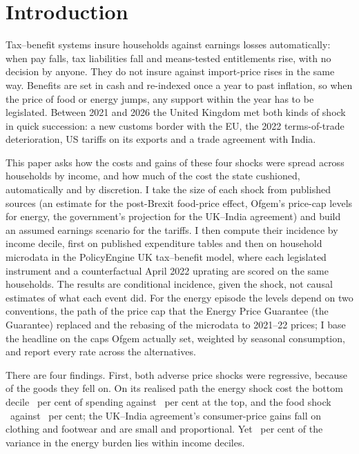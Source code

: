 \section{Introduction}\label{sec:intro}

Tax--benefit systems insure households against earnings losses
automatically: when pay falls, tax liabilities fall and means-tested
entitlements rise, with no decision by anyone. They do not insure
against import-price rises in the same way. Benefits are set in cash
and re-indexed once a year to past inflation, so when the price of
food or energy jumps, any support within the year has to be
legislated. Between 2021 and 2026 the United Kingdom met both kinds of
shock in quick succession: a new customs border with the EU, the 2022
terms-of-trade deterioration, US tariffs on its exports and a trade
agreement with India.

This paper asks how the costs and gains of these four shocks were
spread across households by income, and how much of the cost the state
cushioned, automatically and by discretion. I take the size
of each shock from published sources (an estimate for the post-Brexit
food-price effect, Ofgem's price-cap levels for energy, the
government's projection for the UK--India agreement) and build an
assumed earnings scenario for the tariffs. I then compute their
incidence by income decile, first on published expenditure tables and
then on household microdata in the PolicyEngine UK tax--benefit model,
where each legislated instrument and a counterfactual April 2022
uprating are scored on the same households. The results are
conditional incidence, given the shock, not causal estimates of what
each event did. For the energy episode the levels depend on two
conventions, the path of the price cap that the Energy Price Guarantee (the Guarantee) replaced
and the rebasing of the microdata to 2021--22 prices; I base the headline on the caps Ofgem actually set, weighted by seasonal
consumption, and report every rate across the alternatives.

There are four findings. First, both adverse price shocks were
regressive, because of the goods they fell on. On its realised path
the energy shock cost the bottom decile
\MsEnergyRealisedPctSpendDecOne\ per cent of spending against
\MsEnergyRealisedPctSpendDecTen\ per cent at the top, and the food
shock \MsTcaWindowAvgPctSpendDecOne\ against
\MsTcaWindowAvgPctSpendDecTen\ per cent; the UK--India agreement's
consumer-price gains fall on clothing and footwear and are small and
proportional. Yet \SsWithinPct\ per cent of the variance in the energy
burden lies within income deciles.

